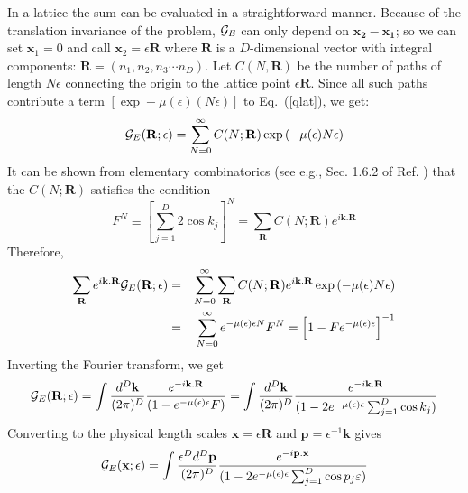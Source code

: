 \documentclass{article}
\def\eq#1{{Eq.~(\ref{#1})}}
\begin{document}
In a lattice the sum can be evaluated in a straightforward manner.
Because of the translation invariance of the problem, ${\cal G}_E$
can only depend on $\mathbf{ x_2-x_1}$; so we can set ${\mathbf x_1}=0$
and call ${\mathbf x_2}=\epsilon {\mathbf R}$ where ${\mathbf R}$ is a
$D$-dimensional vector with integral components:
${\mathbf R}=(n_1,n_2,n_3\cdots n_D)$. Let $C(N,{\mathbf R})$ be the number of
paths of length $N\epsilon$ connecting the origin to the lattice
point $\epsilon{\mathbf R}$. Since all such paths contribute a term
$[\exp-\mu(\epsilon)(N\epsilon)]$ to \eq{qlat}, we get:
\begin{equation} 
{\cal G}_E({\mathbf R};\epsilon)=
\sum^{\infty}_{N=0}C(N;{\mathbf R})\exp\left(-\mu(\epsilon)N\epsilon \right)
\label{latticesum1}
\end{equation} 
It can be shown from elementary combinatorics (see e.g., Sec. 1.6.2 of Ref. \cite{tpqft}) that   the  
$C(N;{\mathbf R})$ satisfies the condition
\begin{equation} 
F^N\equiv\left[\sum_{j=1}^D 2\cos k_j\right]^N
=
\sum_{{\mathbf R}} C(N;{\mathbf R})e^{i\mathbf{ k.R}} 
\label{sevenfive}
\end{equation} 
Therefore,
\begin{eqnarray} 
\sum_{{\mathbf R}}e^{i\mathbf{ k.R}}
{\cal G}_E({\mathbf R};\epsilon)&=&
\sum^{\infty}_{N=0}\sum_{{\mathbf R}}C(N;{\mathbf R})
e^{i\mathbf{ k.R}}\exp\left( -\mu(\epsilon)N\epsilon\right)\nonumber\\
&=&\sum^{\infty}_{N=0}e^{-\mu(\epsilon)\epsilon  N}
F^N
=\left[1-Fe^{-\mu(\epsilon)\epsilon}\right]^{-1} 
\end{eqnarray}
Inverting the Fourier transform, we get
\begin{eqnarray}  
{\cal G}_E({\mathbf R};\epsilon)=\int
{d^D{\mathbf k}\over (2\pi)^D}
{e^{-i\mathbf{ k.R}}\over (1-e^{-\mu(\epsilon)\epsilon}F)}
=\int{d^D{\mathbf k}\over (2\pi)^D}
{e^{-i\mathbf{ k.R}}\over (1-2e^{-\mu(\epsilon)\epsilon}
\sum^D_{j=1}\cos k_j)} 
\end{eqnarray}
Converting to the physical length scales
${\mathbf x}=\epsilon{\mathbf R}$ and
${\mathbf p}=\epsilon^{-1}{\mathbf k}$ gives
\begin{equation} 
{\cal G}_E({\mathbf x};\epsilon)=
\int{\epsilon^D d^D{\mathbf p}\over(2\pi)^D}
{e^{-i\mathbf{ p.x}}\over (1-2e^{-\mu(\epsilon)\epsilon}
\sum^D_{j=1}\cos p_j\varepsilon)} 
\label{capgcape}
\end{equation} 
\end{document}

